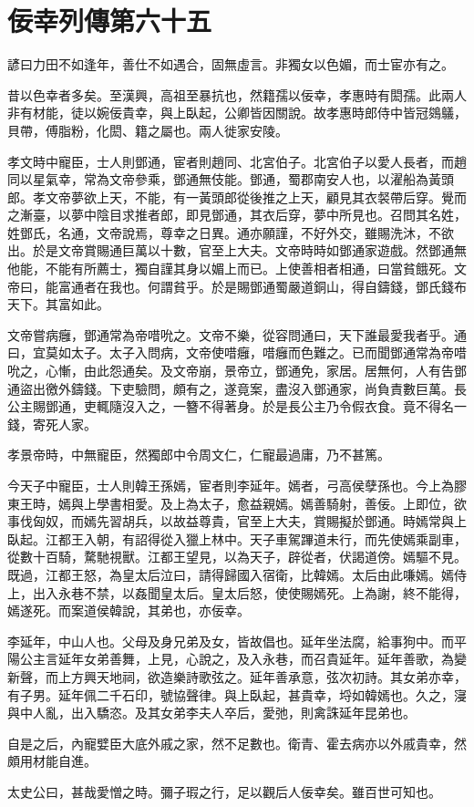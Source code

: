 \chapter{佞幸列傳第六十五}

諺曰力田不如逢年，善仕不如遇合，固無虛言。非獨女以色媚，而士宦亦有之。

昔以色幸者多矣。至漢興，高祖至暴抗也，然籍孺以佞幸，孝惠時有閎孺。此兩人非有材能，徒以婉佞貴幸，與上臥起，公卿皆因關說。故孝惠時郎侍中皆冠鵕鸃，貝帶，傅脂粉，化閎、籍之屬也。兩人徙家安陵。

孝文時中寵臣，士人則鄧通，宦者則趙同、北宮伯子。北宮伯子以愛人長者，而趙同以星氣幸，常為文帝參乘，鄧通無伎能。鄧通，蜀郡南安人也，以濯船為黃頭郎。孝文帝夢欲上天，不能，有一黃頭郎從後推之上天，顧見其衣裻帶后穿。覺而之漸臺，以夢中陰目求推者郎，即見鄧通，其衣后穿，夢中所見也。召問其名姓，姓鄧氏，名通，文帝說焉，尊幸之日異。通亦願謹，不好外交，雖賜洗沐，不欲出。於是文帝賞賜通巨萬以十數，官至上大夫。文帝時時如鄧通家遊戲。然鄧通無他能，不能有所薦士，獨自謹其身以媚上而已。上使善相者相通，曰當貧餓死。文帝曰，能富通者在我也。何謂貧乎。於是賜鄧通蜀嚴道銅山，得自鑄錢，鄧氏錢布天下。其富如此。

文帝嘗病癰，鄧通常為帝唶吮之。文帝不樂，從容問通曰，天下誰最愛我者乎。通曰，宜莫如太子。太子入問病，文帝使唶癰，唶癰而色難之。已而聞鄧通常為帝唶吮之，心慚，由此怨通矣。及文帝崩，景帝立，鄧通免，家居。居無何，人有告鄧通盜出徼外鑄錢。下吏驗問，頗有之，遂竟案，盡沒入鄧通家，尚負責數巨萬。長公主賜鄧通，吏輒隨沒入之，一簪不得著身。於是長公主乃令假衣食。竟不得名一錢，寄死人家。

孝景帝時，中無寵臣，然獨郎中令周文仁，仁寵最過庸，乃不甚篤。

今天子中寵臣，士人則韓王孫嫣，宦者則李延年。嫣者，弓高侯孽孫也。今上為膠東王時，嫣與上學書相愛。及上為太子，愈益親嫣。嫣善騎射，善佞。上即位，欲事伐匈奴，而嫣先習胡兵，以故益尊貴，官至上大夫，賞賜擬於鄧通。時嫣常與上臥起。江都王入朝，有詔得從入獵上林中。天子車駕蹕道未行，而先使嫣乘副車，從數十百騎，騖馳視獸。江都王望見，以為天子，辟從者，伏謁道傍。嫣驅不見。既過，江都王怒，為皇太后泣曰，請得歸國入宿衛，比韓嫣。太后由此嗛嫣。嫣侍上，出入永巷不禁，以姦聞皇太后。皇太后怒，使使賜嫣死。上為謝，終不能得，嫣遂死。而案道侯韓說，其弟也，亦佞幸。

李延年，中山人也。父母及身兄弟及女，皆故倡也。延年坐法腐，給事狗中。而平陽公主言延年女弟善舞，上見，心說之，及入永巷，而召貴延年。延年善歌，為變新聲，而上方興天地祠，欲造樂詩歌弦之。延年善承意，弦次初詩。其女弟亦幸，有子男。延年佩二千石印，號協聲律。與上臥起，甚貴幸，埒如韓嫣也。久之，寖與中人亂，出入驕恣。及其女弟李夫人卒后，愛弛，則禽誅延年昆弟也。

自是之后，內寵嬖臣大底外戚之家，然不足數也。衛青、霍去病亦以外戚貴幸，然頗用材能自進。

太史公曰，甚哉愛憎之時。彌子瑕之行，足以觀后人佞幸矣。雖百世可知也。